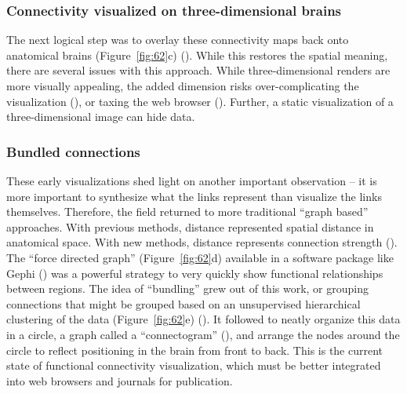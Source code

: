 \documentclass{report}
\begin{document}
\subsubsection{Connectivity visualized on three-dimensional brains}
The next logical step was to overlay these connectivity maps back onto anatomical brains (Figure~\ref{fig:62}c) (\cite{Worsley_undated-et,Foucher2005-vz}). While this restores the spatial meaning, there are several issues with this approach.  While three-dimensional renders are more visually appealing, the added dimension risks over-complicating the visualization (\cite{Sebrechts1999-xk}), or taxing the web browser (\cite{Schinko2014-re}). Further, a static visualization of a three-dimensional image can hide data.
 
\subsubsection{Bundled connections}
These early visualizations shed light on another important observation – it is more important to synthesize what the links represent than visualize the links themselves.  Therefore, the field returned to more traditional ``graph based'' approaches.  With previous methods, distance represented spatial distance in anatomical space.  With new methods, distance represents connection strength (\cite{Achard2006-kg}).  The ``force directed graph'' (Figure~\ref{fig:62}d) available in a software package like Gephi (\cite{Jacomy2014-bl}) was a powerful strategy to very quickly show functional relationships between regions.  The idea of ``bundling'' grew out of this work, or grouping connections that might be grouped based on an unsupervised hierarchical clustering of the data (Figure~\ref{fig:62}e) (\cite{Irimia2012-bl,Zuo2012-ba}). It followed to neatly organize this data in a circle, a graph called a ``connectogram'' (\cite{Van_Horn2012-we}), and arrange the nodes around the circle to reflect positioning in the brain from front to back.  This is the current state of functional connectivity visualization, which must be better integrated into web browsers and journals for publication.
\end{document}
